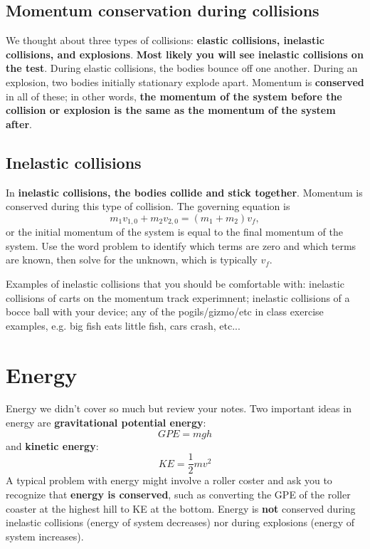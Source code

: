 \documentclass [handout]{tufte-handout}
\begin{document}
\subsection{Momentum conservation during collisions}
We thought about three types of collisions: \textbf{elastic collisions, inelastic collisions, and explosions}. \textbf{Most likely you will see inelastic collisions on the test}. During elastic collisions, the bodies bounce off one another. During an explosion, two bodies initially stationary explode apart. Momentum is \textbf{conserved} in all of these; in other words, \textbf{the momentum of the system before the collision or explosion is the same as the momentum of the system after}.

\subsection{Inelastic collisions}
In \textbf{inelastic collisions, the bodies collide and stick together}. Momentum is conserved during this type of collision. The governing equation is 
\begin{equation*}
m_1 v_{1,0} + m_2 v_{2,0} = (m_1 + m_2) v_{f},
\end{equation*} 
or the initial momentum of the system is equal to the final momentum of the system. Use the word problem to identify which terms are zero and which terms are known, then solve for the unknown, which is typically $v_f$. 

Examples of inelastic collisions that you should be comfortable with: inelastic collisions of carts on the momentum track experimnent; inelastic collisions of a bocce ball with your device; any of the pogils/gizmo/etc in class exercise examples, e.g. big fish eats little fish, cars crash, etc... 

\section{Energy}
Energy we didn't cover so much but review your notes. Two important ideas in energy are \textbf{gravitational potential energy}:
\begin{equation*}
GPE = mgh
\end{equation*}
and \textbf{kinetic energy}:
\begin{equation*}
KE = \frac{1}{2} m v^2
\end{equation*}
A typical problem with energy might involve a roller coster and ask you to recognize that \textbf{energy is conserved}, such as converting the GPE of the roller coaster at the highest hill to KE at the bottom. Energy is \textbf{not} conserved during inelastic collisions (energy of system decreases) nor during explosions (energy of system increases). 
\end{document}
